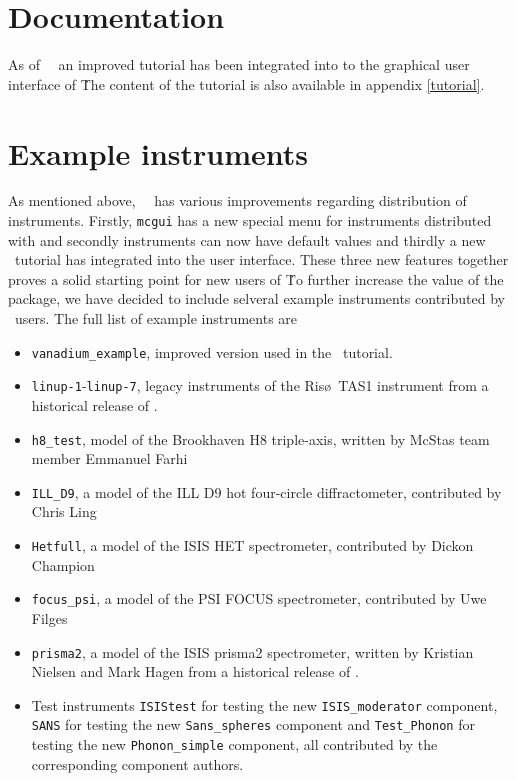 \section{Documentation}
\label{s:new-features:documentation}
As of \MCS\ \version\ an improved tutorial has been integrated
into to the graphical user interface of \MCS\. The content of the
tutorial is also available in appendix \ref{tutorial}.

\section{Example instruments}
\label{s:new-features:instruments}
As mentioned above, \MCS\ \version\ has various improvements regarding
distribution of instruments. Firstly, \verb+mcgui+ has a new special
menu for instruments distributed with \MCS and secondly instruments can
now have default values and thirdly a new \MCS\ tutorial has
integrated into the user interface. These three new features together
proves a solid starting point for new users of \MCS\. To further
increase the value of the package, we have decided to include selveral
example instruments contributed by \MCS\ users. The full list of 
example instruments are
\begin{itemize}
\item{\verb+vanadium_example+, improved version used in the \MCS\
    tutorial.}
\item{\verb+linup-1+-\verb+linup-7+, legacy instruments of the Ris\o\
    TAS1 instrument from a historical release of \MCS.}
\item{\verb+h8_test+, model of the Brookhaven H8 triple-axis, written
    by McStas team member Emmanuel Farhi}
\item{\verb+ILL_D9+, a model of the ILL D9 hot four-circle
    diffractometer, contributed by Chris Ling}
\item{\verb+Hetfull+, a model of the ISIS HET spectrometer,
    contributed by Dickon Champion}
\item{\verb+focus_psi+, a model of the PSI FOCUS spectrometer,
    contributed by Uwe Filges}
\item{\verb+prisma2+, a model of the ISIS prisma2 spectrometer,
    written by Kristian Nielsen and Mark Hagen from a historical release of \MCS.}
\item{Test instruments \verb+ISIStest+ for testing the new
    \verb+ISIS_moderator+ component, \verb+SANS+ for testing the new
    \verb+Sans_spheres+ component and \verb+Test_Phonon+ for testing
    the new \verb+Phonon_simple+ component, all contributed by the
    corresponding component authors.} 
\end{itemize}



